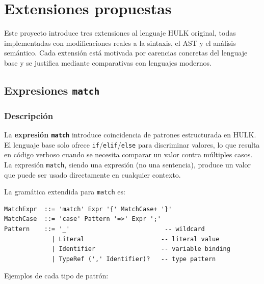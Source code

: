 \documentclass[12pt, a4paper]{article}
\begin{document}
\newpage


\section{Extensiones propuestas}
\label{sec:extensiones}

Este proyecto introduce tres extensiones al lenguaje HULK original, todas
implementadas con modificaciones reales a la sintaxis, el AST y el análisis
semántico. Cada extensión está motivada por carencias concretas del lenguaje base
y se justifica mediante comparativas con lenguajes modernos.

\subsection{Expresiones \texttt{match}}

\subsubsection{Descripción}

La \textbf{expresión \texttt{match}} introduce coincidencia de patrones
estructurada en HULK. El lenguaje base solo ofrece
\texttt{if}/\texttt{elif}/\texttt{else} para discriminar valores, lo que
resulta en código verboso cuando se necesita comparar un valor contra múltiples
casos. La expresión \texttt{match}, siendo una expresión (no una sentencia),
produce un valor que puede ser usado directamente en cualquier contexto.

La gramática extendida para \texttt{match} es:

\begin{lstlisting}[language={},caption={Gramática BNF de match}, label=lst:match-bnf]
MatchExpr  ::= 'match' Expr '{' MatchCase+ '}'
MatchCase  ::= 'case' Pattern '=>' Expr ';'
Pattern    ::= '_'                          -- wildcard
             | Literal                     -- literal value
             | Identifier                  -- variable binding
             | TypeRef (',' Identifier)?   -- type pattern
\end{lstlisting}

Ejemplos de cada tipo de patrón:
\end{document}
